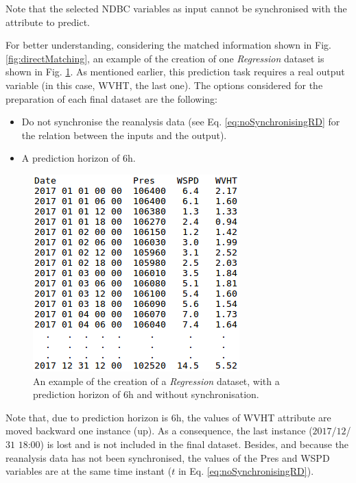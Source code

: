 \documentclass[energies,article,submit,moreauthors,pdftex]{Definitions/mdpi}
\begin{document}
\begin{itemize}
						Note that the selected NDBC variables as input cannot be synchronised with the attribute to predict.
						
 						For better understanding, considering the matched information shown in Fig. \ref{fig:directMatching}, an example of the creation of one \textit{Regression} dataset is shown in Fig. \ref{fig:regressionNoSync}. As mentioned earlier, this prediction task requires a real output variable (in this case, WVHT, the last one). The options considered for the preparation of each final dataset are the following:
 							\begin{itemize}
 								\item Do not synchronise the reanalysis data (see Eq. \ref{eq:noSynchronisingRD} for the relation between the inputs and the output).
 								\item A prediction horizon of $6$h.
 							\end{itemize}
 							 							
							\begin{figure}[ht!]
								\centering
								\includegraphics[scale=0.49]{figures/FigureRegressionNoSync.png}
								\caption{An example of the creation of a \textit{Regression} dataset, with a prediction horizon of $6$h and without synchronisation.}
								\label{fig:regressionNoSync}
							\end{figure}
 						
 						Note that, due to prediction horizon is $6$h, the values of WVHT attribute are moved backward one instance (up). As a consequence, the last instance ($2017$/$12$/$31$ $18$:$00$) is lost and is not included in the final dataset. Besides, and because the reanalysis data has not been synchronised, the values of the Pres and WSPD variables are at the same time instant ($t$ in Eq. \ref{eq:noSynchronisingRD}).
						

\end{itemize}
\end{document}
